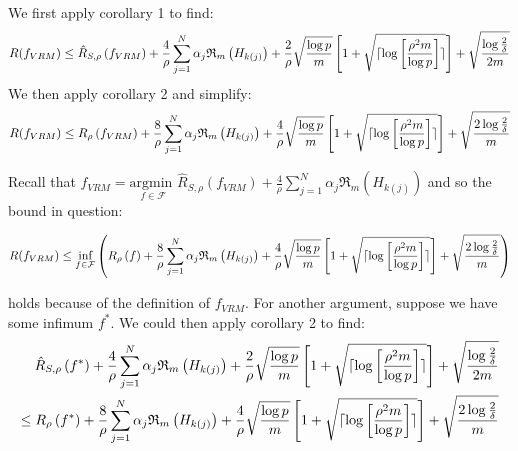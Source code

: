 \documentclass[]{article}
\title{}
\author{}
\begin{document}
\maketitle

\section{}

We first apply corollary 1 to find:
\begin{equation}
	R(f_{VRM}) \le \hat{R}_{S,\rho}\left(f_{VRM}\right) + \frac{4}{\rho} \sum_{j=1}^{N} \alpha_j \mathfrak{R}_m \left( H_{k \left( j \right)} \right) + \frac{2}{\rho} \sqrt{\frac{\log p}{m}} \left[1+\sqrt{\lceil \log \left[ \frac{\rho^2 m}{\log p} \right]\rceil}\right] + \sqrt{\frac{\log \frac{2}{\delta}}{2m}}
\notag
\end{equation}
We then apply corollary 2 and simplify:
\begin{equation}
	R(f_{VRM}) \le R_\rho\left(f_{VRM}\right) + \frac{8}{\rho} \sum_{j=1}^{N} \alpha_j \mathfrak{R}_m \left( H_{k \left( j \right)} \right) + \frac{4}{\rho} \sqrt{\frac{\log p}{m}} \left[1+\sqrt{\lceil \log \left[ \frac{\rho^2 m}{\log p} \right]\rceil}\right] + \sqrt{\frac{2\log \frac{2}{\delta}}{m}}
\notag
\end{equation}

\noindent Recall that $f_{VRM} = \underset{f \in \mathcal{F}}{\text{argmin }} \hat{R}_{S,\rho}\left(f_{VRM}\right) + \frac{4}{\rho} \sum_{j=1}^{N} \alpha_j \mathfrak{R}_m \left( H_{k \left( j \right)} \right)$ and so the bound in question:

\begin{equation}
	R(f_{VRM}) \le \underset{f \in \mathcal{F}}{\text{inf}}\left(R_\rho\left(f\right) + \frac{8}{\rho} \sum_{j=1}^{N} \alpha_j \mathfrak{R}_m \left( H_{k \left( j \right)} \right) + \frac{4}{\rho} \sqrt{\frac{\log p}{m}} \left[1+\sqrt{\lceil \log \left[ \frac{\rho^2 m}{\log p} \right]\rceil}\right] + \sqrt{\frac{2\log \frac{2}{\delta}}{m}}\right)
\notag
\end{equation}

\noindent holds because of the definition of $f_{VRM}$. For another argument, suppose we have some infimum $f^*$. We could then apply corollary 2 to find:
\begin{equation}
\begin{split}
	\hat{R}_{S,\rho}\left(f^*\right) + \frac{4}{\rho} \sum_{j=1}^{N} \alpha_j \mathfrak{R}_m \left( H_{k \left( j \right)} \right) + \frac{2}{\rho} \sqrt{\frac{\log p}{m}} \left[1+\sqrt{\lceil \log \left[ \frac{\rho^2 m}{\log p} \right]\rceil}\right] + \sqrt{\frac{\log \frac{2}{\delta}}{2m}} \\
	\le R_{\rho}\left(f^*\right) + \frac{8}{\rho} \sum_{j=1}^{N} \alpha_j \mathfrak{R}_m \left( H_{k \left( j \right)} \right) + \frac{4}{\rho} \sqrt{\frac{\log p}{m}} \left[1+\sqrt{\lceil \log \left[ \frac{\rho^2 m}{\log p} \right]\rceil}\right] + \sqrt{\frac{2\log \frac{2}{\delta}}{m}}
\end{split}
\notag
\end{equation}
\end{document}
